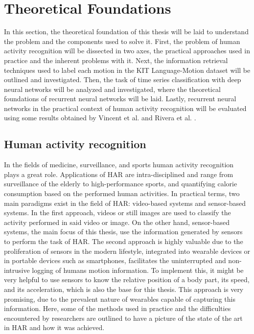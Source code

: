 \chapter{Theoretical Foundations}\label{chap:theoretical_foundations}
In this section, the theoretical foundation of this thesis will be laid to understand the problem and the components used to solve it. First, the problem of human activity recognition will be dissected in two axes, the practical approaches used in practice and the inherent problems with it. Next, the information retrieval techniques used to label each motion in the KIT Language-Motion dataset will be outlined and investigated. Then, the task of time series classification with deep neural networks will be analyzed and investigated, where the theoretical foundations of recurrent neural networks will be laid. Lastly, recurrent neural networks in the practical context of human activity recognition will be evaluated using some results obtained by Vincent et al. \cite{vincent2020human} and Rivera et al. \cite{rivera2017recognition}.
	\section{Human activity recognition}\label{sec:HAR}
		In the fields of medicine, surveillance, and sports human activity recognition plays a great role. Applications of HAR are intra-disciplined and range from surveillance of the elderly to high-performance sports, and quantifying calorie consumption based on the performed human activities. In practical terms, two main paradigms exist in the field of HAR: video-based systems and sensor-based systems\cite{chen2021deep}. In the first approach, videos or still images are used to classify the activity performed in said video or image. On the other hand, sensor-based systems, the main focus of this thesis, use the information generated by sensors to perform the task of HAR. The second approach is highly valuable due to the proliferation of sensors in the modern lifestyle, integrated into wearable devices or in portable devices such as smartphones, facilitates the uninterrupted and non-intrusive logging of humans motion information\cite{chen2021deep}.\newline
		To implement this, it might be very helpful to use sensors to know the relative position of a body part, its speed, and its acceleration, which is also the base for this thesis. This approach is very promising, due to the prevalent nature of wearables capable of capturing this information. Here, some of the methods used in practice and the difficulties encountered by researchers are outlined to have a picture of the state of the art in HAR and how it was achieved.\newline
